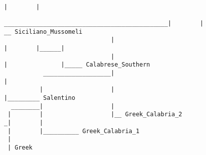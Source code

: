 \begin{figure}[H]
\begin{center}
{\begin{verbatim}
                                                                             |        |
                               ______________________________________________|        |       __ Siciliano_Mussomeli
                              |                                              |        |______|
                              |                                              |               |_____ Calabrese_Southern
           ___________________|                                              |
          |                   |                                              |_________ Salentino
  ________|                   |
 |        |                   |__ Greek_Calabria_2
_|        |
 |        |__________ Greek_Calabria_1
 |
 | Greek



\end{verbatim}
}
\label{...}
\end{center}
\end{figure}
